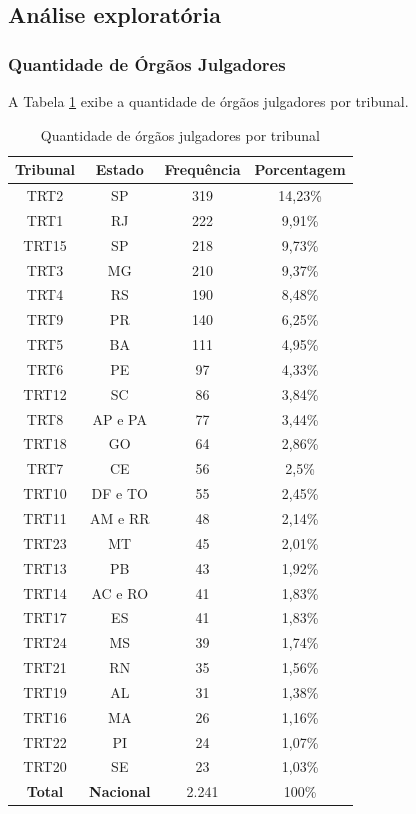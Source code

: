 \subsection{Análise exploratória}
\subsubsection{Quantidade de Órgãos Julgadores}

A Tabela \ref{tbl:tribunais_qtd_ojs} exibe a quantidade de órgãos julgadores por tribunal.

\begin{table}[ht]
\centering
\caption{Quantidade de órgãos julgadores por tribunal}
\begin{tabular}{c c|cc}
  \hline
 Tribunal & Estado & Frequência & Porcentagem \\ 
   \hline
  TRT2 & SP & 319 & 14,23\% \\ 
  TRT1 & RJ & 222 & 9,91\% \\ 
  TRT15 & SP & 218 & 9,73\% \\ 
  TRT3 & MG & 210 & 9,37\% \\ 
  TRT4 & RS & 190 & 8,48\% \\ 
  TRT9 & PR & 140 & 6,25\% \\ 
  TRT5 & BA & 111 & 4,95\% \\ 
  TRT6 & PE &  97 & 4,33\% \\ 
  TRT12 & SC &  86 & 3,84\% \\ 
  TRT8 & AP e PA &  77 & 3,44\% \\ 
  TRT18 & GO &  64 & 2,86\% \\ 
  TRT7 & CE &  56 & 2,5\% \\ 
  TRT10 & DF e TO &  55 & 2,45\% \\ 
  TRT11 & AM e RR &  48 & 2,14\% \\ 
  TRT23 & MT &  45 & 2,01\% \\ 
  TRT13 & PB &  43 & 1,92\% \\ 
  TRT14 & AC e RO &  41 & 1,83\% \\ 
  TRT17 & ES &  41 & 1,83\% \\ 
  TRT24 & MS &  39 & 1,74\% \\ 
  TRT21 & RN &  35 & 1,56\% \\ 
  TRT19 & AL &  31 & 1,38\% \\ 
  TRT16 & MA &  26 & 1,16\% \\ 
  TRT22 & PI &  24 & 1,07\% \\ 
  TRT20 & SE &  23 & 1,03\% \\
  \hline
  \textbf{Total} & \textbf{Nacional} & 2.241 & 100\% \\ \hline
\end{tabular}
\label{tbl:tribunais_qtd_ojs}
\end{table}

